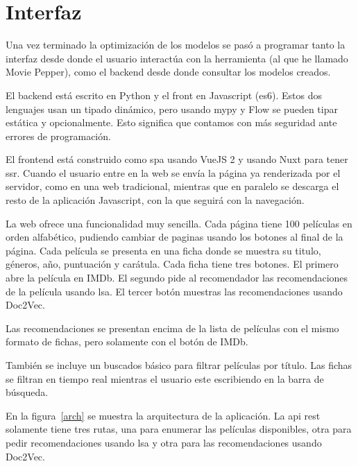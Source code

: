 \documentclass[withindex, glossary]{cam-thesis}
\begin{document}
\chapter{Interfaz}
Una vez terminado la optimización de los modelos se pasó a programar tanto la interfaz desde donde el usuario interactúa con la herramienta (al que he llamado Movie Pepper), como el backend desde donde consultar los modelos creados.

El backend está escrito en Python y el front en Javascript (\acrshort{es6}). Estos dos lenguajes usan un tipado dinámico, pero usando mypy y Flow se pueden tipar estática y opcionalmente. Esto significa que contamos con más seguridad ante errores de programación.

El frontend está construido como \acrshort{spa} usando VueJS 2 y usando Nuxt para tener \acrshort{ssr}. Cuando el usuario entre en la web se envía la página ya renderizada por el servidor, como en una web tradicional, mientras que en paralelo se descarga el resto de la aplicación Javascript, con la que seguirá con la navegación.

La web ofrece una funcionalidad muy sencilla. Cada página tiene 100 películas en orden alfabético, pudiendo cambiar de paginas usando los botones al final de la página. Cada película se presenta en una ficha donde se muestra su titulo, géneros, año, puntuación y carátula. Cada ficha tiene tres botones. El primero abre la película en IMDb. El segundo pide al recomendador las recomendaciones de la película usando \acrshort{lsa}. El tercer botón muestras las recomendaciones usando Doc2Vec.

Las recomendaciones se presentan encima de la lista de películas con el mismo formato de fichas, pero solamente con el botón de IMDb.

También se incluye un buscados básico para filtrar películas por título. Las fichas se filtran en tiempo real mientras el usuario este escribiendo en la barra de búsqueda.

En la figura~\ref{arch} se muestra la arquitectura de la aplicación. La \acrshort{api} \acrshort{rest} solamente tiene tres rutas, una para enumerar las películas disponibles, otra para pedir recomendaciones usando \acrshort{lsa} y otra para las recomendaciones usando Doc2Vec.
\end{document}

